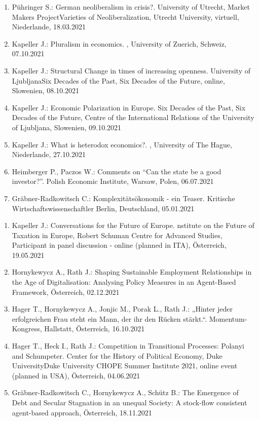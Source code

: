 \begin{enumerate}
	\item Pühringer S.: German neoliberalism in crisis?. University of Utrecht, Market Makers ProjectVarieties of Neoliberalization, Utrecht University, virtuell, Niederlande, 18.03.2021
	\item Kapeller J.: Pluralism in economics. , University of Zuerich, Schweiz, 07.10.2021
	\item Kapeller J.: Structural Change in times of increasing openness. University of LjubljanaSix Decades of the Past, Six Decades of the Future, online, Slowenien, 08.10.2021
	\item Kapeller J.: Economic Polarization in Europe. Six Decades of the Past, Six Decades of the Future, Centre of the International Relations of the University of Ljubljana, Slowenien, 09.10.2021
	\item Kapeller J.: What is heterodox economics?. , University of The Hague, Niederlande, 27.10.2021
	\item Heimberger P., Paczos W.: Comments on “Can the state be a good investor?”. Polish Economic Institute, Warsaw, Polen, 06.07.2021
	\item Gräbner-Radkowitsch C.: Komplexitätsökonomik - ein Teaser. Kritische Wirtschaftswissenschaftler Berlin, Deutschland, 05.01.2021
\end{enumerate}

\begin{enumerate}
	\item Kapeller J.: Conversations for the Future of Europe. nstitute on the Future of Taxation in Europe, Robert Schuman Centre for Advanced Studies, Participant in panel discussion - online (planned in ITA), Österreich, 19.05.2021
	\item Hornykewycz A., Rath J.: Shaping Sustainable Employment Relationships in the Age of Digitalisation: Analysing Policy Measures in an Agent-Based Framework, Österreich, 02.12.2021
	\item Hager T., Hornykewycz A., Jonjic M., Porak L., Rath J.: „Hinter jeder erfolgreichen Frau steht ein Mann, der ihr den Rücken stärkt.“. Momentum-Kongress, Hallstatt, Österreich, 16.10.2021
	\item Hager T., Heck I., Rath J.: Competition in Transitional Processes: Polanyi and Schumpeter. Center for the History of Political Economy, Duke UniversityDuke University CHOPE Summer Institute 2021, online event (planned in USA), Österreich, 04.06.2021
	\item Gräbner-Radkowitsch C., Hornykewycz A., Schütz B.: The Emergence of Debt and Secular Stagnation in an unequal Society: A stock-flow consistent agent-based approach, Österreich, 18.11.2021
\end{enumerate}
